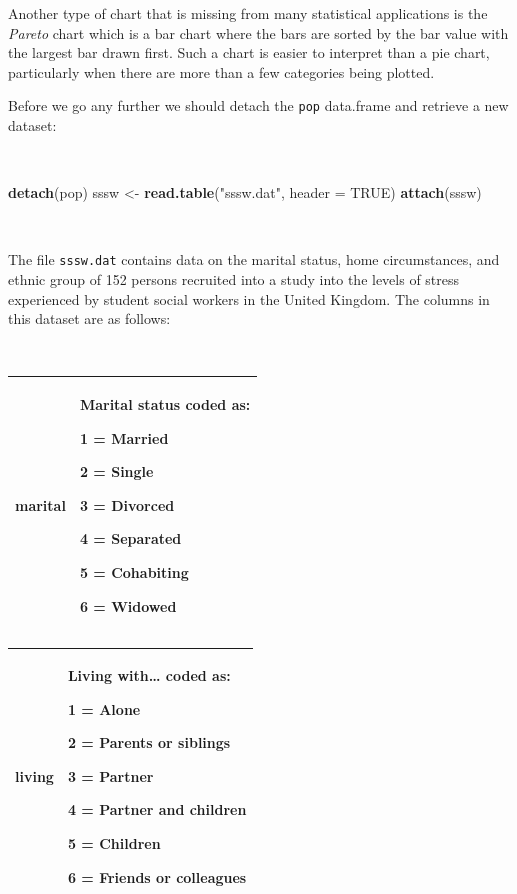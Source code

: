 \documentclass[12pt,a4paper]{book}
\newenvironment{Shaded}{\begin{snugshade}}{\end{snugshade}}
\newcommand{\KeywordTok}[1]{\textcolor[rgb]{0.13,0.29,0.53}{\textbf{#1}}}
\newcommand{\DataTypeTok}[1]{\textcolor[rgb]{0.13,0.29,0.53}{#1}}
\newcommand{\StringTok}[1]{\textcolor[rgb]{0.31,0.60,0.02}{#1}}
\newcommand{\OtherTok}[1]{\textcolor[rgb]{0.56,0.35,0.01}{#1}}
\newcommand{\NormalTok}[1]{#1}
\theoremstyle{definition}
\theoremstyle{definition}
\theoremstyle{definition}
\theoremstyle{remark}
\begin{document}
Another type of chart that is missing from many statistical applications
is the \emph{Pareto} chart which is a bar chart where the bars are
sorted by the bar value with the largest bar drawn first. Such a chart
is easier to interpret than a pie chart, particularly when there are
more than a few categories being plotted.

Before we go any further we should detach the \texttt{pop} data.frame
and retrieve a new dataset:

~

\begin{Shaded}
\begin{Highlighting}[]
\KeywordTok{detach}\NormalTok{(pop)}
\NormalTok{sssw <-}\StringTok{ }\KeywordTok{read.table}\NormalTok{(}\StringTok{"sssw.dat"}\NormalTok{, }\DataTypeTok{header =} \OtherTok{TRUE}\NormalTok{)}
\KeywordTok{attach}\NormalTok{(sssw)}
\end{Highlighting}
\end{Shaded}

~

The file \texttt{sssw.dat} contains data on the marital status, home
circumstances, and ethnic group of 152 persons recruited into a study
into the levels of stress experienced by student social workers in the
United Kingdom. The columns in this dataset are as follows:

~

\begin{longtable}[]{@{}ll@{}}
\toprule
\begin{minipage}[t]{0.48\columnwidth}\raggedright
\textbf{marital}\strut
\end{minipage} & \begin{minipage}[t]{0.48\columnwidth}\raggedright
Marital status coded as:

1 = Married

2 = Single

3 = Divorced

4 = Separated

5 = Cohabiting

6 = Widowed\strut
\end{minipage}\tabularnewline
\bottomrule
\end{longtable}

\begin{longtable}[]{@{}ll@{}}
\toprule
\begin{minipage}[t]{0.48\columnwidth}\raggedright
\textbf{living}\strut
\end{minipage} & \begin{minipage}[t]{0.48\columnwidth}\raggedright
Living with\ldots{} coded as:

1 = Alone

2 = Parents or siblings

3 = Partner

4 = Partner and children

5 = Children

6 = Friends or colleagues\strut
\end{minipage}\tabularnewline
\bottomrule
\end{longtable}
\end{document}

